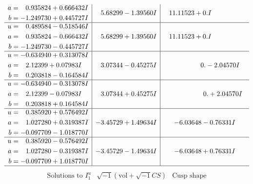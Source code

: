 \documentclass[1p]{elsarticle_modified}
\theoremstyle{definition}
\newcommand{\I}{\sqrt{-1}}
\begin{document}
$$\begin{array}{c|c|c}
\begin{aligned}
a &= \phantom{-}0.935824 + 0.666432 I \\
b &= -1.249730 + 0.445727 I\end{aligned}
 & \phantom{-}5.68299 - 1.39560 I & \phantom{-}11.11523 + 0. I\phantom{ +0.000000I} \\ \hline\begin{aligned}
u &= \phantom{-}0.489584 - 0.518546 I \\
a &= \phantom{-}0.935824 - 0.666432 I \\
b &= -1.249730 - 0.445727 I\end{aligned}
 & \phantom{-}5.68299 + 1.39560 I & \phantom{-}11.11523 + 0. I\phantom{ +0.000000I} \\ \hline\begin{aligned}
u &= -0.634940 + 0.313078 I \\
a &= \phantom{-}2.12399 + 0.07983 I \\
b &= \phantom{-}0.203818 - 0.164584 I\end{aligned}
 & \phantom{-}3.07344 - 0.45275 I & \phantom{-0.000000 } 0. - 2.04570 I \\ \hline\begin{aligned}
u &= -0.634940 - 0.313078 I \\
a &= \phantom{-}2.12399 - 0.07983 I \\
b &= \phantom{-}0.203818 + 0.164584 I\end{aligned}
 & \phantom{-}3.07344 + 0.45275 I & \phantom{-0.000000 -}0. + 2.04570 I \\ \hline\begin{aligned}
u &= \phantom{-}0.385920 + 0.576492 I \\
a &= \phantom{-}1.027280 + 0.319387 I \\
b &= -0.097709 - 1.018770 I\end{aligned}
 & -3.45729 + 1.49634 I & -6.03648 - 0.76331 I \\ \hline\begin{aligned}
u &= \phantom{-}0.385920 - 0.576492 I \\
a &= \phantom{-}1.027280 - 0.319387 I \\
b &= -0.097709 + 1.018770 I\end{aligned}
 & -3.45729 - 1.49634 I & -6.03648 + 0.76331 I\\
 \hline 
 \end{array}$$\newpage$$\begin{array}{c|c|c}  
\text{Solutions to }I^u_{1}& \I (\text{vol} + \sqrt{-1}CS) & \text{Cusp shape}\\

\end{array}$$
\end{document}
